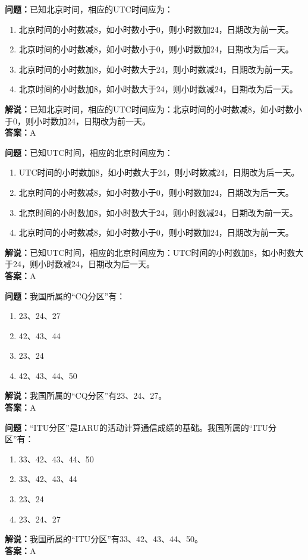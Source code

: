 \documentclass[UTF8]{ctexbook}
\begin{document}
\textbf{问题：}已知北京时间，相应的UTC时间应为：
\begin{enumerate}[label=\Alph*), leftmargin=3em]
  \item 北京时间的小时数减8，如小时数小于0，则小时数加24，日期改为前一天。
  \item 北京时间的小时数减8，如小时数小于0，则小时数加24，日期改为后一天。
  \item 北京时间的小时数加8，如小时数大于24，则小时数减24，日期改为前一天。
  \item 北京时间的小时数加8，如小时数大于24，则小时数减24，日期改为后一天。
\end{enumerate}
\textbf{解说：}已知北京时间，相应的UTC时间应为：北京时间的小时数减8，如小时数小于0，则小时数加24，日期改为前一天。\\
\textbf{答案：}A

\textbf{问题：}已知UTC时间，相应的北京时间应为：
\begin{enumerate}[label=\Alph*), leftmargin=3em]
  \item UTC时间的小时数加8，如小时数大于24，则小时数减24，日期改为后一天。
  \item 北京时间的小时数减8，如小时数小于0，则小时数加24，日期改为后一天。
  \item 北京时间的小时数加8，如小时数大于24，则小时数减24，日期改为前一天。
  \item 北京时间的小时数减8，如小时数小于0，则小时数加24，日期改为前一天。
\end{enumerate}
\textbf{解说：}已知UTC时间，相应的北京时间应为：UTC时间的小时数加8，如小时数大于24，则小时数减24，日期改为后一天。\\
\textbf{答案：}A

\textbf{问题：}我国所属的“CQ分区”有：
\begin{enumerate}[label=\Alph*), leftmargin=3em]
  \item 23、24、27
  \item 42、43、44
  \item 23、24
  \item 42、43、44、50
\end{enumerate}
\textbf{解说：}我国所属的“CQ分区”有23、24、27。\\
\textbf{答案：}A

\textbf{问题：}“ITU分区”是IARU的活动计算通信成绩的基础。我国所属的“ITU分区”有：
\begin{enumerate}[label=\Alph*), leftmargin=3em]
  \item 33、42、43、44、50
  \item 33、42、43、44
  \item 23、24
  \item 23、24、27
\end{enumerate}
\textbf{解说：}我国所属的“ITU分区”有33、42、43、44、50。\\
\textbf{答案：}A
\end{document}
